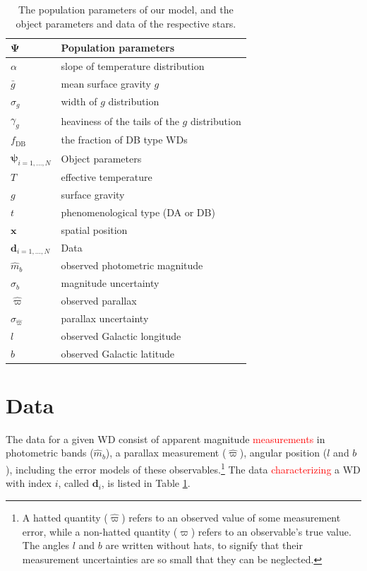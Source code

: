 \documentclass[fleqn,usenatbib]{mnras}
\newcommand{\changes}[1]{\textcolor{red}{#1}}
\newcommand{\popp}{\boldsymbol{\Psi}}
\newcommand{\objp}{\boldsymbol{\psi}}
\newcommand{\data}{\mathbf{d}}
\newcommand{\Teff}{T}
\newcommand{\logg}{g}
\begin{document}
\begin{table}
	\centering
	\caption{The population parameters of our model, and the object parameters and data of the respective stars.}
	\label{tab:parameters}
    \begin{tabular}{l l}
		\hline
		$\popp$  & Population parameters \\
		\hline
		$\alpha$ & slope of temperature distribution \\
		$\bar{g}$ & mean surface gravity $\logg$ \\
		$\sigma_g$ & width of $\logg$ distribution \\
		$\gamma_g$ & heaviness of the tails of the $\logg$ distribution \\
		$f_\text{DB}$ & the fraction of DB type WDs \\
        \hline
        $\objp_{i=1,...,N}$  & Object parameters \\
        \hline
        $\Teff$ & effective temperature \\
        $\logg$ & surface gravity \\
        $t$ & phenomenological type (DA or DB) \\
        $\mathbf{x}$ & spatial position  \\
        \hline
        $\data_{i=1,...,N}$ & Data \\
        \hline
        $\hat{m}_b$ & observed photometric magnitude \\
        $\sigma_b$ & magnitude uncertainty \\
        $\hat{\varpi}$ & observed parallax \\
        $\sigma_{\hat{\varpi}}$ & parallax uncertainty \\
        $l$ & observed Galactic longitude \\
        $b$ & observed Galactic latitude \\
		\hline
	\end{tabular}
\end{table}




\section{Data}\label{sec:data}

The data for a given WD consist of apparent magnitude \changes{measurements} in photometric bands ($\hat{m}_b$), a parallax measurement ($\hat{\varpi}$), angular position ($l$ and $b$), including the error models of these observables.\footnote{A hatted quantity ($\hat{\varpi}$) refers to an observed value of some measurement error, while a non-hatted quantity ($\varpi$) refers to an observable's true value. The angles $l$ and $b$ are written without hats, to signify that their measurement uncertainties are so small that they can be neglected.} The data \changes{characterizing} a WD with index $i$, called $\data_i$, is listed in Table \ref{tab:parameters}.
\end{document}
